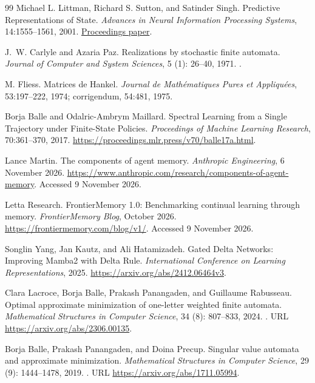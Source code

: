 \begin{thebibliography}{99}
Michael L. Littman, Richard S. Sutton, and Satinder Singh.
Predictive Representations of State.
\emph{Advances in Neural Information Processing Systems}, 14:1555--1561, 2001.
\href{https://proceedings.neurips.cc/paper/2001/file/1e4d36177d71bbb3558e43af9577d70e-Paper.pdf}{Proceedings paper}.

J.~W. Carlyle and Azaria Paz.
\newblock Realizations by stochastic finite automata.
\newblock \emph{Journal of Computer and System Sciences}, 5
  (1): 26--40, 1971.
\newblock {}.

M. Fliess.
Matrices de Hankel. \emph{Journal de Math\'ematiques Pures et Appliqu\'ees}, 53:197--222, 1974; corrigendum, 54:481, 1975.

Borja Balle and Odalric-Ambrym Maillard.
Spectral Learning from a Single Trajectory under Finite-State Policies.
\emph{Proceedings of Machine Learning Research}, 70:361--370, 2017.
\url{https://proceedings.mlr.press/v70/balle17a.html}.

Lance Martin.
The components of agent memory.
\emph{Anthropic Engineering}, 6 November 2026.
\url{https://www.anthropic.com/research/components-of-agent-memory}.
Accessed 9 November 2026.

Letta Research.
FrontierMemory 1.0: Benchmarking continual learning through memory.
\emph{FrontierMemory Blog}, October 2026.
\url{https://frontiermemory.com/blog/v1/}.
Accessed 9 November 2026.

Songlin Yang, Jan Kautz, and Ali Hatamizadeh.
Gated Delta Networks: Improving Mamba2 with Delta Rule.
\emph{International Conference on Learning Representations}, 2025.
\url{https://arxiv.org/abs/2412.06464v3}.

Clara Lacroce, Borja Balle, Prakash Panangaden, and Guillaume Rabusseau.
\newblock Optimal approximate minimization of one-letter weighted finite
  automata.
\newblock \emph{Mathematical Structures in Computer Science}, 34
  (8): 807--833, 2024.
\newblock {}.
\newblock URL \url{https://arxiv.org/abs/2306.00135}.

Borja Balle, Prakash Panangaden, and Doina Precup.
\newblock Singular value automata and approximate minimization.
\newblock \emph{Mathematical Structures in Computer Science}, 29
  (9): 1444--1478, 2019.
\newblock {}.
\newblock URL \url{https://arxiv.org/abs/1711.05994}.


\end{thebibliography}
